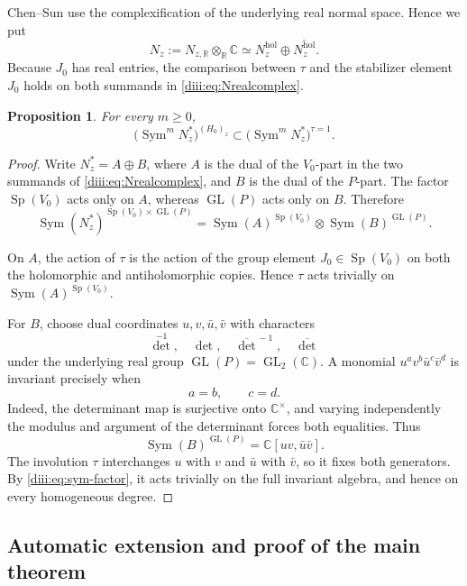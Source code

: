 \documentclass[11pt,reqno]{amsart}
\numberwithin{equation}{section}
\newtheorem{proposition}[theorem]{Proposition}
\theoremstyle{definition}
\theoremstyle{remark}
\newcommand{\C}{\mathbb C}
\newcommand{\GL}{\operatorname{GL}}
\newcommand{\Sp}{\operatorname{Sp}}
\newcommand{\Sym}{\operatorname{Sym}}
\begin{document}
Chen--Sun use the complexification of the underlying real normal space.  Hence we put
\begin{equation}\label{diii:eq:Nrealcomplex}
  N_z:=N_{z,\mathbb R}\otimes_{\mathbb R}\C
  \simeq N_z^{\mathrm{hol}}\oplus\overline{N_z^{\mathrm{hol}}}.
\end{equation}
Because $J_0$ has real entries, the comparison between $\tau$ and the stabilizer element $J_0$ holds on both summands in \eqref{diii:eq:Nrealcomplex}.

\begin{proposition}\label{diii:prop:normal-parity}
For every $m\ge0$,
\begin{equation}\label{diii:eq:normal-even}
  \bigl(\Sym^mN_z^*\bigr)^{(H_0)_z}
  \subset
  \bigl(\Sym^mN_z^*\bigr)^{\tau=1}.
\end{equation}
\end{proposition}

\begin{proof}
Write $N_z^*=A\oplus B$, where $A$ is the dual of the $V_0$-part in the two summands of \eqref{diii:eq:Nrealcomplex}, and $B$ is the dual of the $P$-part.  The factor $\Sp(V_0)$ acts only on $A$, whereas $\GL(P)$ acts only on $B$.  Therefore
\begin{equation}\label{diii:eq:sym-factor}
  \Sym(N_z^*)^{\Sp(V_0)\times\GL(P)}
  =\Sym(A)^{\Sp(V_0)}\otimes\Sym(B)^{\GL(P)}.
\end{equation}

On $A$, the action of $\tau$ is the action of the group element
$J_0\in\Sp(V_0)$ on both the holomorphic and antiholomorphic copies.  Hence $\tau$ acts trivially on $\Sym(A)^{\Sp(V_0)}$.

For $B$, choose dual coordinates $u,v,\bar u,\bar v$ with characters
\[
  \det^{-1},\quad\det,\quad\overline{\det}^{\,-1},\quad\overline{\det}
\]
under the underlying real group $\GL(P)=\GL_2(\C)$.  A monomial
$u^av^b\bar u^c\bar v^d$ is invariant precisely when
\[
  a=b,\qquad c=d.
\]
Indeed, the determinant map is surjective onto $\C^\times$, and varying independently the modulus and argument of the determinant forces both equalities.  Thus
\[
  \Sym(B)^{\GL(P)}=\C[uv,\bar u\bar v].
\]
The involution $\tau$ interchanges $u$ with $v$ and $\bar u$ with $\bar v$, so it fixes both generators.  By \eqref{diii:eq:sym-factor}, it acts trivially on the full invariant algebra, and hence on every homogeneous degree.
\end{proof}

\subsection{Automatic extension and proof of the main theorem}
\end{document}
